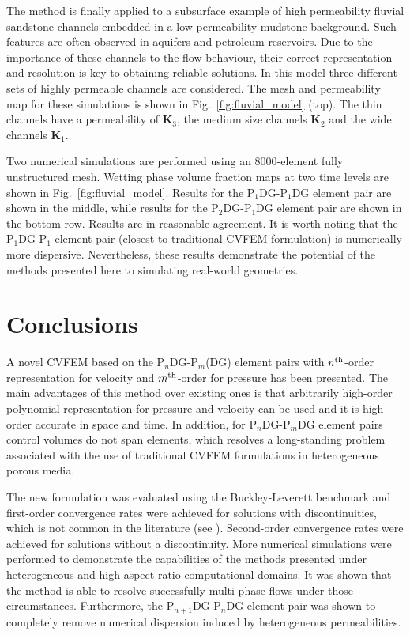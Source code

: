 \documentclass[times]{fldauth}
\newcommand{\PN}[2][error]{P$_{#1}$DG-P$_{#2}$}
\begin{document}
The method is finally applied to a subsurface example of high
permeability fluvial sandstone channels embedded in a low permeability
mudstone background. Such features are often observed in aquifers and
petroleum reservoirs. Due to the importance of these channels to the
flow behaviour, their correct representation and resolution is key to
obtaining reliable solutions. In this model three different sets of
highly permeable channels are considered. The mesh and permeability
map for these simulations is shown in Fig.~\ref{fig:fluvial_model}
(top). The thin channels have a permeability of $\mathbf{K}_\text{3}$,
the medium size channels $\mathbf{K}_\text{2}$ and the wide channels
$\mathbf{K}_\text{1}$.

Two numerical simulations are performed using an 8000-element fully
unstructured mesh. Wetting phase volume fraction maps at two time
levels are shown in Fig.~\ref{fig:fluvial_model}. Results for
the \PN[1]{1}DG element pair are shown in the middle, while results
for the \PN[2]{1}DG element pair are shown in the bottom row. Results
are in reasonable agreement. It is worth noting that the \PN[1]{1}
element pair (closest to traditional CVFEM formulation) is numerically
more dispersive. Nevertheless, these results demonstrate the potential
of the methods presented here to simulating real-world geometries.



\section{Conclusions}\label{conc}

A novel CVFEM based on the \PN[n]{m}(DG) element pairs with $n^{\rm
  th}$-order representation for velocity and $m^{\rm th}$-order for
pressure has been presented. The main advantages of this method over
existing ones is that arbitrarily high-order polynomial representation
for pressure and velocity can be used and it is high-order accurate in
space and time. In addition, for \PN[n]{m}DG element pairs control
volumes do not span elements, which resolves a long-standing problem
associated with the use of traditional CVFEM formulations in
heterogeneous porous media.

The new formulation was evaluated using the Buckley-Leverett benchmark
and first-order convergence rates were achieved for solutions with
discontinuities, which is not common in the literature
(see \cite{Schmid,Hoteit}). Second-order convergence rates were
achieved for solutions without a discontinuity. More numerical
simulations were performed to demonstrate the capabilities of the
methods presented under heterogeneous and high aspect ratio
computational domains. It was shown that the method is able to resolve
successfully multi-phase flows under those circumstances. Furthermore,
the \PN[n+1]{n}DG element pair was shown to completely remove
numerical dispersion induced by heterogeneous permeabilities.
\end{document}
